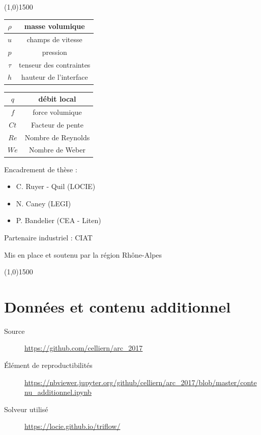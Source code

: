 \documentclass[a0,portrait]{a0poster}
\begin{document}
\begin{center}
    \line(1,0){1500}
\end{center}

\begin{multicols}{2}
    \begin{center}
        \begin{tabular}{|c|c|}
            \hline $\rho$ & masse volumique \\
            \hline $u$ & champs de vitesse \\
            \hline $p$ & pression \\
            \hline $\tau$ & tenseur des contraintes \\
            \hline $h$ & hauteur de l'interface \\
            \hline
        \end{tabular}
        \begin{tabular}{|c|c|}
            \hline $q$ & débit local \\
            \hline $f$ & force volumique \\
            \hline $Ct$ & Facteur de pente \\
            \hline $Re$ & Nombre de Reynolds \\
            \hline $W\!e$ & Nombre de Weber \\
            \hline
        \end{tabular}
    \end{center}

        Encadrement de thèse :
        \begin{itemize}
            \item C. Ruyer - Quil (LOCIE)
            \item N. Caney (LEGI)
            \item P. Bandelier (CEA - Liten)
        \end{itemize}

        Partenaire industriel : CIAT

        Mis en place et soutenu par la région Rhône-Alpes
\end{multicols}

\begin{center}
    \line(1,0){1500}
\end{center}



\section*{Données et contenu additionnel}
\begin{description}
    \item[Source] \url{https://github.com/celliern/arc_2017}
    \item[Élément de reproductibilités] \url{https://nbviewer.jupyter.org/github/celliern/arc_2017/blob/master/contenu_additionnel.ipynb}
    \item[Solveur utilisé] \url{https://locie.github.io/triflow/}
\end{description}
\end{document}

